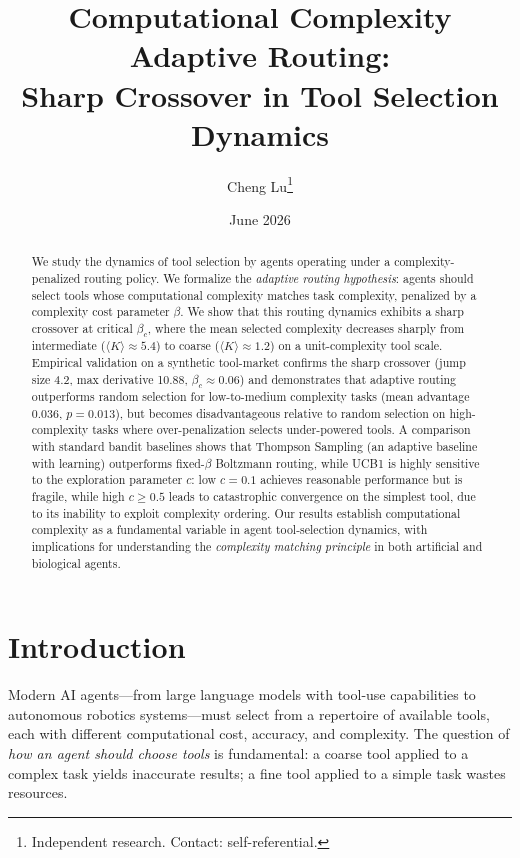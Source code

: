 \documentclass[12pt]{article}
\title{Computational Complexity Adaptive Routing:\\Sharp Crossover in Tool Selection Dynamics}
\author{Cheng Lu\thanks{Independent research. Contact: self-referential.}}
\date{June 2026}
\theoremstyle{definition}
\begin{document}
\maketitle

\begin{abstract}
We study the dynamics of tool selection by agents operating under a complexity-penalized routing policy. We formalize the \emph{adaptive routing hypothesis}: agents should select tools whose computational complexity matches task complexity, penalized by a complexity cost parameter $\beta$. We show that this routing dynamics exhibits a sharp crossover at critical $\beta_c$, where the mean selected complexity decreases sharply from intermediate ($\langle K \rangle \approx 5.4$) to coarse ($\langle K \rangle \approx 1.2$) on a unit-complexity tool scale. Empirical validation on a synthetic tool-market confirms the sharp crossover (jump size 4.2, max derivative 10.88, $\beta_c \approx 0.06$) and demonstrates that adaptive routing outperforms random selection for low-to-medium complexity tasks (mean advantage 0.036, $p=0.013$), but becomes disadvantageous relative to random selection on high-complexity tasks where over-penalization selects under-powered tools. A comparison with standard bandit baselines shows that Thompson Sampling (an adaptive baseline with learning) outperforms fixed-$\beta$ Boltzmann routing, while UCB1 is highly sensitive to the exploration parameter $c$: low $c=0.1$ achieves reasonable performance but is fragile, while high $c\geq 0.5$ leads to catastrophic convergence on the simplest tool, due to its inability to exploit complexity ordering. Our results establish computational complexity as a fundamental variable in agent tool-selection dynamics, with implications for understanding the \emph{complexity matching principle} in both artificial and biological agents.
\end{abstract}

\section{Introduction}

Modern AI agents---from large language models with tool-use capabilities to autonomous robotics systems---must select from a repertoire of available tools, each with different computational cost, accuracy, and complexity. The question of \emph{how an agent should choose tools} is fundamental: a coarse tool applied to a complex task yields inaccurate results; a fine tool applied to a simple task wastes resources.
\end{document}
